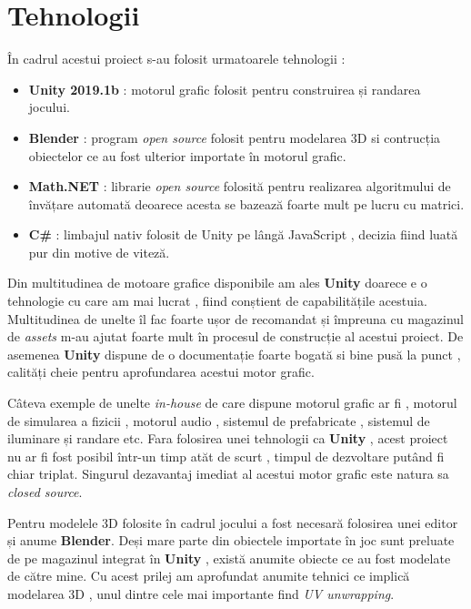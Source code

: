 \chapter{Tehnologii}

În cadrul acestui proiect s-au folosit urmatoarele tehnologii :
\begin{itemize}
\item \textbf{Unity 2019.1b} : motorul grafic folosit pentru construirea și randarea jocului.
\item \textbf{Blender} : program \textit{open source} folosit pentru modelarea 3D si contrucția obiectelor ce au fost ulterior importate în motorul grafic.
\item \textbf{Math.NET} : librarie \textit{open source} folosită pentru realizarea algoritmului de învățare automată deoarece acesta se bazează foarte mult pe lucru cu matrici.
\item \textbf{C\#} : limbajul nativ folosit de Unity pe lângă JavaScript , decizia fiind luată pur din motive de viteză.
\end{itemize}

Din multitudinea de motoare grafice disponibile am ales \textbf{Unity} doarece e o tehnologie cu care am mai lucrat , fiind conștient de capabilitățile acestuia. Multitudinea de unelte îl fac foarte ușor de recomandat și împreuna cu magazinul de \textit{assets} m-au ajutat foarte mult în procesul de construcție al acestui proiect. De asemenea \textbf{Unity} dispune de o documentație foarte bogată si bine pusă la punct , calități cheie pentru aprofundarea acestui motor grafic.\par

Câteva exemple de unelte \textit{in-house} de care dispune motorul grafic ar fi , motorul de simularea a fizicii , motorul audio , sistemul de prefabricate , sistemul de iluminare și randare etc. Fara folosirea unei tehnologii ca \textbf{Unity} , acest proiect nu ar fi fost posibil într-un timp atăt de scurt , timpul de dezvoltare putând fi chiar triplat. Singurul dezavantaj imediat al acestui motor grafic este natura sa \textit{closed source}.\par

Pentru modelele 3D folosite în cadrul jocului a fost necesară folosirea unei editor și anume \textbf{Blender}. Deși mare parte din obiectele importate în joc sunt preluate de pe magazinul integrat în \textbf{Unity} , există anumite obiecte ce au fost modelate de către mine. Cu acest prilej am aprofundat anumite tehnici ce implică modelarea 3D , unul dintre cele mai importante find \textit {UV unwrapping}.\par

